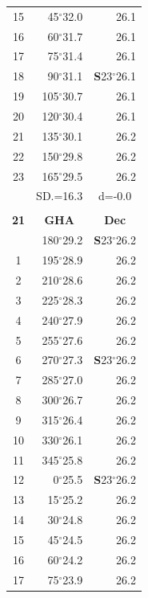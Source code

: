 \documentclass[10pt, a4paper]{report}
\begin{document}
\begin{scriptsize}
\begin{tabular*}{0.2\textwidth}[t]{@{\extracolsep{\fill}}|c|rr|}
15 & 45$^\circ$32.0 & \raisebox{0.24ex}{\boldmath$\cdot$~\boldmath$\cdot$~~}26.1\\
16 & 60$^\circ$31.7 & 26.1\\
17 & 75$^\circ$31.4 & 26.1\\[2Pt]
18 & 90$^\circ$31.1 & \textbf{S}23$^\circ$26.1\\
19 & 105$^\circ$30.7 & 26.1\\
20 & 120$^\circ$30.4 & 26.1\\
21 & 135$^\circ$30.1 & \raisebox{0.24ex}{\boldmath$\cdot$~\boldmath$\cdot$~~}26.2\\
22 & 150$^\circ$29.8 & 26.2\\
23 & 165$^\circ$29.5 & 26.2\\
\hline
\rule{0pt}{2.4ex} & \multicolumn{1}{c}{SD.=16.3} & \multicolumn{1}{c|}{d=-0.0}\\
\hline
\multicolumn{1}{c}{}\\[-0.5ex]\hline
\multicolumn{1}{|c|}{\rule{0pt}{2.6ex}\textbf{21}} & \multicolumn{1}{c}{\textbf{GHA}} & \multicolumn{1}{c|}{\textbf{Dec}}\\
\hline\rule{0pt}{2.6ex}\noindent
0 & 180$^\circ$29.2 & \textbf{S}23$^\circ$26.2\\
1 & 195$^\circ$28.9 & 26.2\\
2 & 210$^\circ$28.6 & 26.2\\
3 & 225$^\circ$28.3 & \raisebox{0.24ex}{\boldmath$\cdot$~\boldmath$\cdot$~~}26.2\\
4 & 240$^\circ$27.9 & 26.2\\
5 & 255$^\circ$27.6 & 26.2\\[2Pt]
6 & 270$^\circ$27.3 & \textbf{S}23$^\circ$26.2\\
7 & 285$^\circ$27.0 & 26.2\\
8 & 300$^\circ$26.7 & 26.2\\
9 & 315$^\circ$26.4 & \raisebox{0.24ex}{\boldmath$\cdot$~\boldmath$\cdot$~~}26.2\\
10 & 330$^\circ$26.1 & 26.2\\
11 & 345$^\circ$25.8 & 26.2\\[2Pt]
12 & 0$^\circ$25.5 & \textbf{S}23$^\circ$26.2\\
13 & 15$^\circ$25.2 & 26.2\\
14 & 30$^\circ$24.8 & 26.2\\
15 & 45$^\circ$24.5 & \raisebox{0.24ex}{\boldmath$\cdot$~\boldmath$\cdot$~~}26.2\\
16 & 60$^\circ$24.2 & 26.2\\
17 & 75$^\circ$23.9 & 26.2\\[2Pt]

\end{tabular*}
\end{scriptsize}
\end{document}
